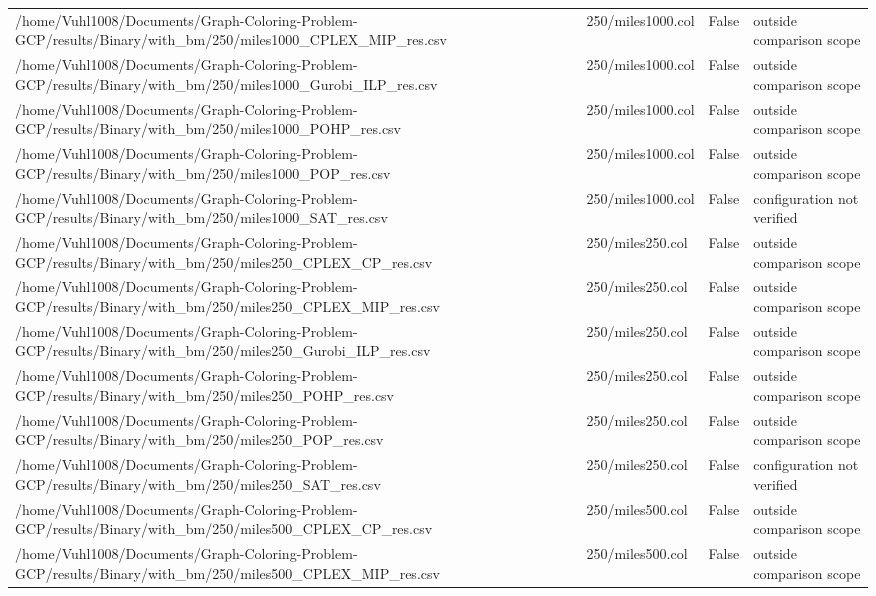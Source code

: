 \begin{table}[htbp]
\begin{tabular}{llll}
/home/Vuhl1008/Documents/Graph-Coloring-Problem-GCP/results/Binary/with\_bm/250/miles1000\_CPLEX\_MIP\_res.csv & 250/miles1000.col & False & outside comparison scope \\
/home/Vuhl1008/Documents/Graph-Coloring-Problem-GCP/results/Binary/with\_bm/250/miles1000\_Gurobi\_ILP\_res.csv & 250/miles1000.col & False & outside comparison scope \\
/home/Vuhl1008/Documents/Graph-Coloring-Problem-GCP/results/Binary/with\_bm/250/miles1000\_POHP\_res.csv & 250/miles1000.col & False & outside comparison scope \\
/home/Vuhl1008/Documents/Graph-Coloring-Problem-GCP/results/Binary/with\_bm/250/miles1000\_POP\_res.csv & 250/miles1000.col & False & outside comparison scope \\
/home/Vuhl1008/Documents/Graph-Coloring-Problem-GCP/results/Binary/with\_bm/250/miles1000\_SAT\_res.csv & 250/miles1000.col & False & configuration not verified \\
/home/Vuhl1008/Documents/Graph-Coloring-Problem-GCP/results/Binary/with\_bm/250/miles250\_CPLEX\_CP\_res.csv & 250/miles250.col & False & outside comparison scope \\
/home/Vuhl1008/Documents/Graph-Coloring-Problem-GCP/results/Binary/with\_bm/250/miles250\_CPLEX\_MIP\_res.csv & 250/miles250.col & False & outside comparison scope \\
/home/Vuhl1008/Documents/Graph-Coloring-Problem-GCP/results/Binary/with\_bm/250/miles250\_Gurobi\_ILP\_res.csv & 250/miles250.col & False & outside comparison scope \\
/home/Vuhl1008/Documents/Graph-Coloring-Problem-GCP/results/Binary/with\_bm/250/miles250\_POHP\_res.csv & 250/miles250.col & False & outside comparison scope \\
/home/Vuhl1008/Documents/Graph-Coloring-Problem-GCP/results/Binary/with\_bm/250/miles250\_POP\_res.csv & 250/miles250.col & False & outside comparison scope \\
/home/Vuhl1008/Documents/Graph-Coloring-Problem-GCP/results/Binary/with\_bm/250/miles250\_SAT\_res.csv & 250/miles250.col & False & configuration not verified \\
/home/Vuhl1008/Documents/Graph-Coloring-Problem-GCP/results/Binary/with\_bm/250/miles500\_CPLEX\_CP\_res.csv & 250/miles500.col & False & outside comparison scope \\
/home/Vuhl1008/Documents/Graph-Coloring-Problem-GCP/results/Binary/with\_bm/250/miles500\_CPLEX\_MIP\_res.csv & 250/miles500.col & False & outside comparison scope \\

\end{tabular}
\end{table}
